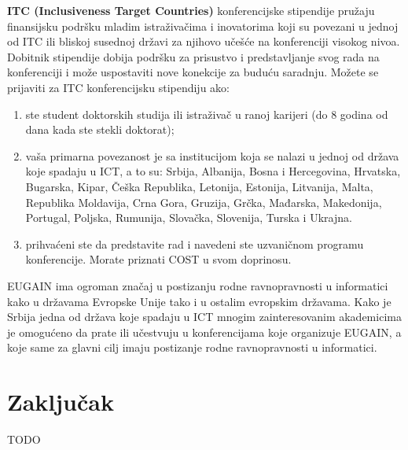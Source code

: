 \documentclass[a4paper]{article}
\begin{document}
\ident \textbf{ITC (Inclusiveness Target Countries)} konferencijske stipendije pružaju finansijsku podršku mladim istraživačima i inovatorima koji su povezani u jednoj od ITC ili bliskoj susednoj državi za njihovo učešće na konferenciji visokog nivoa. Dobitnik stipendije dobija podršku za prisustvo i predstavljanje svog rada na konferenciji i može uspostaviti nove konekcije za buduću saradnju. Možete se prijaviti za ITC konferencijsku stipendiju ako:
\begin{enumerate}
\item ste student doktorskih studija ili istraživač u ranoj karijeri (do 8 godina od dana kada ste stekli doktorat);

\item vaša primarna povezanost je sa institucijom koja se nalazi u jednoj od država koje spadaju u ICT, a to su: Srbija, Albanija, Bosna i Hercegovina, Hrvatska, Bugarska, Kipar, Češka Republika, Letonija, Estonija, Litvanija, Malta, Republika Moldavija, Crna Gora, Gruzija, Grčka, Mađarska, Makedonija, Portugal, Poljska, Rumunija, Slovačka, Slovenija, Turska i Ukrajna.

\item prihvaćeni ste da predstavite rad i navedeni ste uzvaničnom programu konferencije. Morate priznati COST u svom doprinosu.
\end{enumerate}
EUGAIN ima ogroman značaj u postizanju rodne ravnopravnosti u informatici kako u državama Evropske Unije tako i u ostalim evropskim državama. Kako je Srbija jedna od država koje spadaju u ICT mnogim zainteresovanim akademicima je omogućeno da prate ili učestvuju u konferencijama koje organizuje EUGAIN, a koje same za glavni cilj imaju postizanje rodne ravnopravnosti u informatici.

\section{Zaključak}
\label{sec:zakljucak}

TODO

\appendix
 


\appendix
\end{document}
